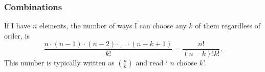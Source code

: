 \documentclass[aspectratio=169,11pt,usenames,dvipsnames]{beamer}
\begin{document}
\begin{frame}
 \frametitle{Combinations}
 \begin{tcolorbox}[title=Combinations]
  If I have $n$ elements, the number of ways I can choose any $k$ of them
  regardless of order, is
  \[
   \frac{n \cdot (n-1) \cdot (n-2) \cdot \ldots \cdot (n-k+1)}{k!} =
   \frac{n!}{(n-k)!k!}.
  \]
  This number is typically written as $\binom{n}{k}$ and read `\alert{ $n$
  choose $k$}'.
 \end{tcolorbox}
\end{frame}
\end{document}
